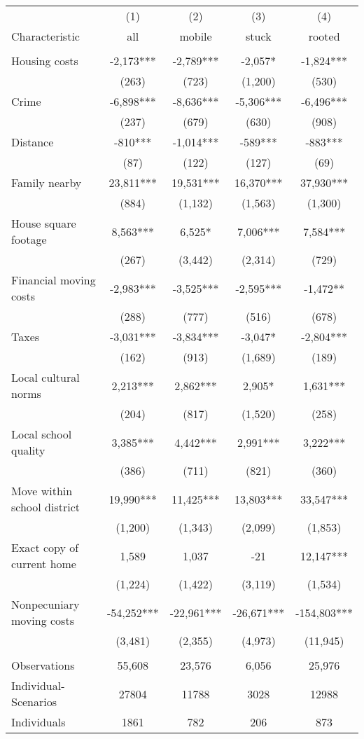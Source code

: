\begin{tabular}{lcccc} \hline
 & (1) & (2) & (3) & (4) \\
Characteristic & all & mobile & stuck & rooted \\ \hline
 &  &  &  &  \\
Housing costs & -2,173*** & -2,789*** & -2,057* & -1,824*** \\
 & (263) & (723) & (1,200) & (530) \\
Crime & -6,898*** & -8,636*** & -5,306*** & -6,496*** \\
 & (237) & (679) & (630) & (908) \\
Distance & -810*** & -1,014*** & -589*** & -883*** \\
 & (87) & (122) & (127) & (69) \\
Family nearby & 23,811*** & 19,531*** & 16,370*** & 37,930*** \\
 & (884) & (1,132) & (1,563) & (1,300) \\
House square footage & 8,563*** & 6,525* & 7,006*** & 7,584*** \\
 & (267) & (3,442) & (2,314) & (729) \\
Financial moving costs & -2,983*** & -3,525*** & -2,595*** & -1,472** \\
 & (288) & (777) & (516) & (678) \\
Taxes & -3,031*** & -3,834*** & -3,047* & -2,804*** \\
 & (162) & (913) & (1,689) & (189) \\
Local cultural norms & 2,213*** & 2,862*** & 2,905* & 1,631*** \\
 & (204) & (817) & (1,520) & (258) \\
Local school quality & 3,385*** & 4,442*** & 2,991*** & 3,222*** \\
 & (386) & (711) & (821) & (360) \\
Move within school district & 19,990*** & 11,425*** & 13,803*** & 33,547*** \\
 & (1,200) & (1,343) & (2,099) & (1,853) \\
Exact copy of current home & 1,589 & 1,037 & -21 & 12,147*** \\
 & (1,224) & (1,422) & (3,119) & (1,534) \\
Nonpecuniary moving costs & -54,252*** & -22,961*** & -26,671*** & -154,803*** \\
 & (3,481) & (2,355) & (4,973) & (11,945) \\
 &  &  &  &  \\
Observations & 55,608 & 23,576 & 6,056 & 25,976 \\
Individual-Scenarios & 27804 & 11788 & 3028 & 12988 \\
 Individuals & 1861 & 782 & 206 & 873 \\ \hline
\end{tabular}
